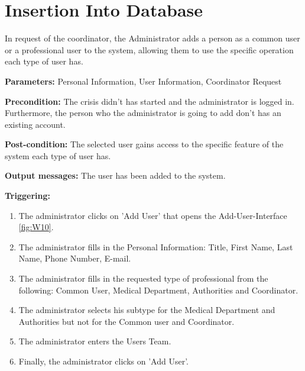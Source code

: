 \section{Insertion Into Database}
\label{operation:AddUser}
In request of the coordinator, the Administrator adds a person as a common user or a professional user 
to the system, allowing them to use the specific operation each type of user has.\\
\begin{description}
\item \textbf{Parameters:} Personal Information, User Information, Coordinator Request
\item \textbf{Precondition:} The crisis didn't has started and the administrator
is logged in. Furthermore, the person who the administrator is going to add
don't has an existing account.
\item \textbf{Post-condition:} The selected user gains access to the specific feature of the system each type of user has.
\item \textbf{Output messages:} The user has been added to the system.
\item \textbf{Triggering:}
\begin{enumerate}
\item The administrator clicks on 'Add User' that opens the
Add-User-Interface \ref{fig:W10}.
\item The administrator fills in the Personal Information: Title, First Name, Last Name, Phone Number, E-mail.
\item The administrator fills in the requested type of professional from the following: Common User, Medical Department, Authorities and Coordinator.
\item The administrator selects his subtype for the Medical Department and Authorities but not for the Common user and Coordinator.
\item The administrator enters the Users Team.
\item Finally, the administrator clicks on 'Add User'.
\end{enumerate}
\end{description}


